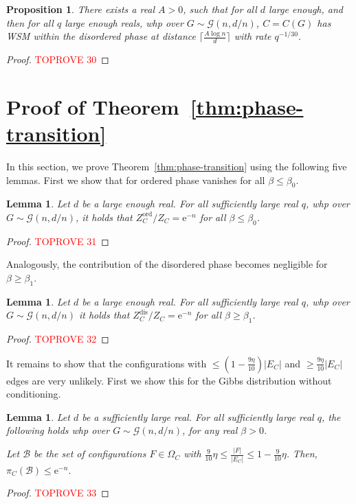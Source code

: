\documentclass[11pt]{article}
\theoremstyle{plain}
\newtheorem{lemma}[theorem]{Lemma}
\newtheorem{proposition}[theorem]{Proposition}
\newcommand{\G}{\mathcal{G}}
\newcommand{\emm}{\mathrm{e}}
\newcommand{\1}{\mathbb{1}}
\newcommand{\ord}{\mathrm{ord}}
\newcommand{\dis}{\mathrm{dis}}
\begin{document}
\begin{proposition}\label{prop:wsm-disorder}
    There exists a real \(A > 0\), such that for all \(d\) large enough, and then for all \(q\) large enough reals, whp over \(G\sim\G(n,d/n)\), \(C=C(G)\) has WSM within the disordered phase at distance \(\lceil \frac{A\log n}{d}\rceil\) with rate \(q^{-1/30}\).
\end{proposition}
\begin{proof}\textcolor{red}{TOPROVE 30}\end{proof}

\section{Proof of Theorem~\ref{thm:phase-transition}}\label{sec:phase-transition}

In this section, we prove Theorem~\ref{thm:phase-transition} using the following five lemmas.
First we show that for ordered phase vanishes for all \(\beta\leq\beta_0\).

\begin{lemma}\label{lem:ordered-phase-vanishes}
    Let \(d\) be a large enough real. For all sufficiently large real \(q\), whp over \(G\sim\G(n,d/n)\), it holds that \(Z^\ord_C / Z_C = \emm^{-n}\) for all \(\beta \leq \beta_0\).
\end{lemma}
\begin{proof}\textcolor{red}{TOPROVE 31}\end{proof}

Analogously, the contribution of the disordered phase becomes negligible for \(\beta \geq \beta_1\).

\begin{lemma}\label{lem:disordered-phase-vanishes}
    Let \(d\) be a large enough real. For all sufficiently large real \(q\), whp over \(G\sim\G(n,d/n)\) it holds that \(Z^\dis_C / Z_C = \emm^{-n}\) for all \(\beta \geq \beta_1\).
\end{lemma}
\begin{proof}\textcolor{red}{TOPROVE 32}\end{proof}

It remains to show that the configurations with \(\leq(1-\tfrac{9\eta}{10})|E_C|\) and \(\geq \tfrac{9\eta}{10}|E_C|\) edges are very unlikely. First we show this for the Gibbs distribution without conditioning.

\begin{lemma}\label{lem:error-vanishes}
    Let $d$ be a sufficiently large real. For all sufficiently large real $q$, the following holds whp over \(G\sim\G(n,d/n)\), for any  real \(\beta > 0\).
    
    Let $\mathcal{B}$ be the set of configurations $F\in \Omega_C$ with $\tfrac{9}{10}\eta\leq \frac{|F|}{|E_C|}\leq 1-\tfrac{9}{10}\eta$.  Then, $\pi_C(\mathcal{B})\leq \emm^{-n}$.
\end{lemma}
\begin{proof}\textcolor{red}{TOPROVE 33}\end{proof}
\end{document}
